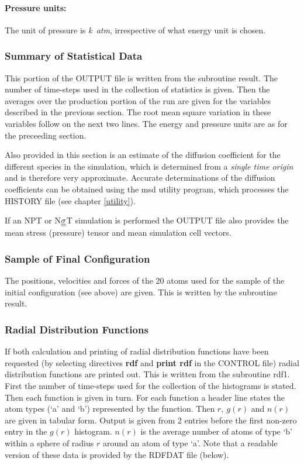 \paragraph*{Pressure units:}

The unit of pressure is {\em k~atm},
irrespective of what energy unit is chosen.

\subsubsection{Summary of Statistical Data}

This portion of the OUTPUT file is written from the subroutine {\sc
result}.  The number of time-steps used in the collection of
statistics is given.  Then the averages over the production portion of
the run are given for the variables described in the previous section.
The root mean square variation in these variables follow on the next
two lines. The energy and pressure
units are as for the preceeding section.

Also provided in this section is an estimate of the diffusion
coefficient for the different species in the simulation, which is
determined from a {\em single time origin} and is therefore very
approximate. Accurate determinations of the diffusion coefficients can
be obtained using the {\sc msd} utility program, which processes the
HISTORY file (see chapter \ref{utility}).

If an NPT or N$\mbox{$\underline{\underline{\bf \sigma}}$}$T simulation is performed the OUTPUT file
also provides the mean stress (pressure) tensor and mean simulation
cell vectors.

\subsubsection{Sample of Final Configuration}

The positions, velocities and forces of the 20 atoms used for the
sample of the initial configuration (see above) are given. This is
written by the subroutine {\sc result}.
 
\subsubsection{Radial Distribution Functions}

If both calculation and printing of radial distribution functions have
been requested (by selecting directives {\bf rdf} and {\bf print rdf}
in the CONTROL file) radial distribution functions are printed out. 
This is written from the subroutine {\sc
rdf1}. First the number of time-steps used for the collection of the
histograms is stated.  Then each function is given in turn. For each
function a header line states the atom types (`a' and `b') represented
by the function. Then $r,~g(r)$ and $n(r)$ are given in tabular form.
Output is given from 2 entries before the first non-zero entry in the
$g(r)$ histogram.  $n(r)$ is the average number of atoms of type `b'
within a sphere of radius $r$ around an atom of type `a'.
Note that a readable version of these data is provided by the 
RDFDAT file (below). 

